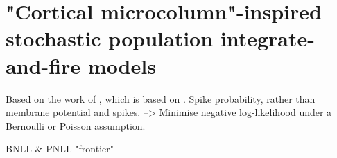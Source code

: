 \documentclass[mphil,deptreport,ai]{infthesis} %
\begin{document}



\section{"Cortical microcolumn"-inspired stochastic population integrate-and-fire models}
\label{microGIF}

Based on the work of \cite{Rene2020}, which is based on \cite{Schwalger2017}.
Spike probability, rather than membrane potential and spikes.
--> Minimise negative log-likelihood under a Bernoulli or Poisson assumption.


BNLL \& PNLL "frontier"


\end{document}
